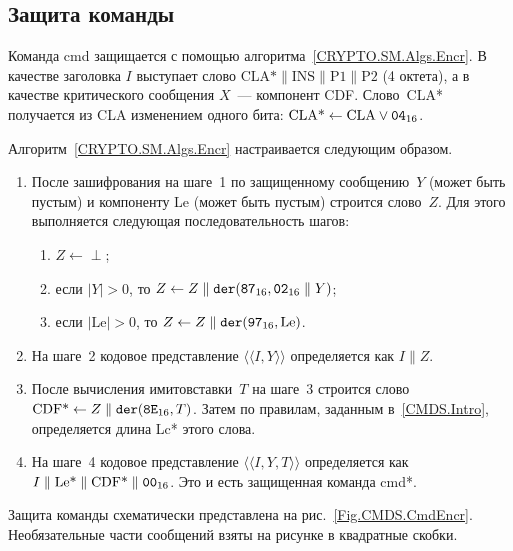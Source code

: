 \subsection{Защита команды}\label{CMDS.SM.EncrCmd}

Команда cmd защищается с помощью алгоритма~\ref{CRYPTO.SM.Algs.Encr}. 
%
В качестве заголовка $I$ выступает слово 
$\text{CLA*} \parallel \text{INS} \parallel \text{P1} \parallel \text{P2}$ 
(4 октета), а в качестве критического сообщения $X$~--- компонент CDF. 
%
Слово~CLA* получается из CLA изменением одного бита:
$\text{CLA*}\leftarrow\text{CLA}\vee\texttt{04}_{16}$.

Алгоритм~\ref{CRYPTO.SM.Algs.Encr} настраивается следующим образом.
\begin{enumerate}
\item
После зашифрования на шаге~1 по защищенному сообщению~$Y$
(может быть пустым) и компоненту Le (может быть пустым)
строится слово~$Z$. Для этого выполняется следующая 
последовательность шагов:
\begin{enumerate}
\item
$Z \gets\perp$;
\item
если $|Y|>0$, то $Z\gets Z\parallel\texttt{der}(\texttt{87}_{16},\texttt{02}_{16}\parallel Y)$;
\item
если $|\text{Le}|>0$, то $Z\gets Z\parallel\texttt{der}(\texttt{97}_{16}, \text{Le})$.
\end{enumerate}
\item
На шаге~2 кодовое представление $\langle\langle I,Y\rangle\rangle$
определяется как $I\parallel Z$.
\item
После вычисления имитовставки~$T$ на шаге~3 строится слово
$\text{CDF*}\gets Z\parallel \texttt{der}(\texttt{8E}_{16}, T)$.
Затем по правилам, заданным в~\ref{CMDS.Intro}, определяется длина Lc* этого 
слова.
\item
На шаге~4 кодовое представление $\langle\langle I,Y,T\rangle\rangle$
определяется как $I\parallel\text{Le*}\parallel\text{CDF*}\parallel\texttt{00}_{16}$.
Это и есть защищенная команда cmd*.
\end{enumerate}

Защита команды схематически представлена на рис.~\ref{Fig.CMDS.CmdEncr}. 
Необязательные части сообщений взяты на рисунке в квадратные скобки.

